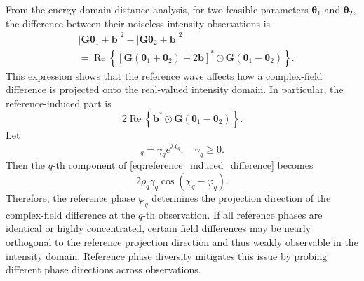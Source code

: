 \documentclass[journal]{IEEEtran}
\begin{document}
From the energy-domain distance analysis, for two feasible parameters $\boldsymbol{\theta}_1$ and $\boldsymbol{\theta}_2$, the difference between their noiseless intensity observations is
\begin{equation}
\begin{aligned}
&\left|
\mathbf{G}\boldsymbol{\theta}_1+\mathbf{b}
\right|^2
-
\left|
\mathbf{G}\boldsymbol{\theta}_2+\mathbf{b}
\right|^2 \\
&=
\operatorname{Re}
\left\{
\left[
\mathbf{G}(\boldsymbol{\theta}_1+\boldsymbol{\theta}_2)
+
2\mathbf{b}
\right]^*
\odot
\mathbf{G}(\boldsymbol{\theta}_1-\boldsymbol{\theta}_2)
\right\}.
\end{aligned}
\label{eq:reference_design_energy_difference}
\end{equation}
This expression shows that the reference wave affects how a complex-field difference is projected onto the real-valued intensity domain. 
In particular, the reference-induced part is
\begin{equation}
2\operatorname{Re}
\left\{
\mathbf{b}^*
\odot
\mathbf{G}(\boldsymbol{\theta}_1-\boldsymbol{\theta}_2)
\right\}.
\label{eq:reference_induced_difference}
\end{equation}
Let
\begin{equation}
[\mathbf{G}(\boldsymbol{\theta}_1-\boldsymbol{\theta}_2)]_q
=
\gamma_q e^{j\chi_q},
\quad
\gamma_q\geq 0.
\end{equation}
Then the $q$-th component of \eqref{eq:reference_induced_difference} becomes
\begin{equation}
2\rho_q\gamma_q
\cos(\chi_q-\varphi_q).
\label{eq:projection_interpretation}
\end{equation}
Therefore, the reference phase $\varphi_q$ determines the projection direction of the complex-field difference at the $q$-th observation. 
If all reference phases are identical or highly concentrated, certain field differences may be nearly orthogonal to the reference projection direction and thus weakly observable in the intensity domain. 
Reference phase diversity mitigates this issue by probing different phase directions across observations.
\end{document}
